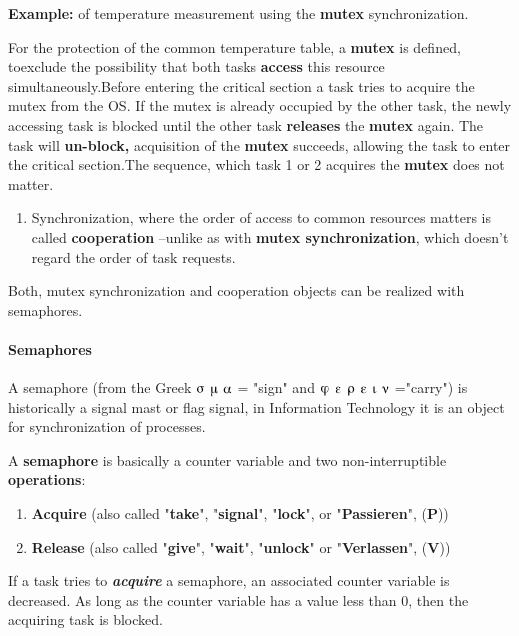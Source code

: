 \textbf{Example:} of temperature measurement using the \textbf{mutex} synchronization.

\textbf{ }For the protection of the common temperature table, a \textbf{mutex} is defined, toexclude the possibility that both tasks \textbf{access} this resource simultaneously.Before entering the critical section a task tries to acquire the mutex from the OS. If the mutex is already occupied by the other task, the newly accessing task is blocked\textbf{\textit{ }}until the other task \textbf{releases} the \textbf{mutex} again. The task will \textbf{un-block,} acquisition of the \textbf{mutex} succeeds, allowing the task to enter the critical section.The sequence, which task 1 or 2 acquires the \textbf{mutex} does not matter.


\begin{enumerate}
\item   Synchronization, where the order of access to common resources matters is called \textbf{cooperation} --unlike as with\textbf{ mutex synchronization}, which doesn't regard the order of task requests.
\end{enumerate}

Both, mutex synchronization and cooperation objects can be realized with semaphores.

\paragraph{ Semaphores}

A semaphore (from the Greek $\sigmaup$ $\muup$ $\alphaup$ = "sign" and $\varphiup$ $\varepsilonup$ $\rhoup$ $\varepsilonup$ $\iotaup$ $\nuup$ ="carry") is historically a signal mast or flag signal, in Information Technology it is an object for synchronization of processes.


A \textbf{semaphore} is basically a counter variable and two non-interruptible \textbf{operations}:  

\begin{enumerate}
\item  \textbf{Acquire}   (also called "\textbf{take}", "\textbf{signal}",  "\textbf{lock}",     or "\textbf{Passieren}", (\textbf{P}))

\item  \textbf{Release}  (also called "\textbf{give}", "\textbf{wait}",  "\textbf{unlock}"  or "\textbf{Verlassen}", (\textbf{V}))
\end{enumerate}

If a task tries to \textbf{\textit{acquire}} a semaphore, an associated counter variable is decreased. As long as the counter variable has a value less than 0, then the acquiring task is blocked.


